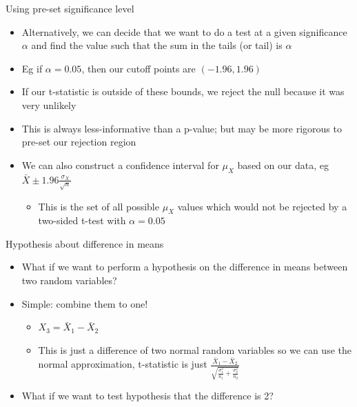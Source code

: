 \documentclass[aspectratio=169]{beamer}
\begin{document}
\begin{frame}{Using pre-set significance level}
    \begin{itemize}
        \item Alternatively, we can decide that we want to do a test at a given significance $\alpha$ and find the value such that the sum in the tails (or tail) is $\alpha$
        \item Eg if $\alpha=0.05$, then our cutoff points are $(-1.96,1.96)$
        \item If our t-statistic is outside of these bounds, we reject the null because it was very unlikely
        \item This is always less-informative than a p-value; but may be more rigorous to pre-set our rejection region
        \item We can also construct a confidence interval for $\mu_X$ based on our data, eg $\bar{X} \pm 1.96 \frac{\sigma_X}{\sqrt{n}}$
        \begin{itemize}
            \item This is the set of all possible $\mu_X$ values which would not be rejected by a two-sided t-test with $\alpha=0.05$
        \end{itemize}
    \end{itemize}
\end{frame}

\begin{frame}{Hypothesis about difference in means}
    \begin{itemize}
        \item What if we want to perform a hypothesis on the difference in means between two random variables?
        \item Simple: combine them to one!
        \begin{itemize}
            \item $X_3 = \bar{X}_1 - \bar{X}_2$
            \item This is just a difference of two normal random variables so we can use the normal approximation, t-statistic is just $\frac{\bar{X}_1 - \bar{X}_2}{\sqrt{\frac{\sigma_1^2}{n_1} + \frac{\sigma_2^2}{n_2}}}$
        \end{itemize}
        \item What if we want to test hypothesis that the difference is 2?
    \end{itemize}
\end{frame}
\end{document}
